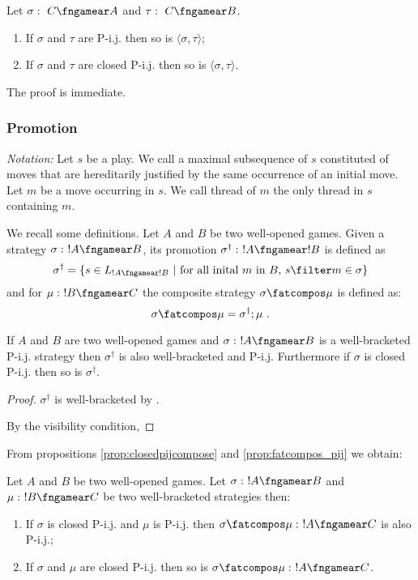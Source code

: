 \begin{proposition}
\label{prop:pij_paring} Let $\sigma :\ C \fngamear A$  and $\tau :\
C\fngamear B$.
\begin{enumerate}
\item If $\sigma$ and $\tau$ are P-i.j.
then so is $\langle \sigma , \tau \rangle$;
\item If $\sigma$ and $\tau$ are closed P-i.j. then so is $\langle \sigma , \tau \rangle$.
\end{enumerate}
\end{proposition}
The proof is immediate.


\subsubsection{Promotion}
\emph{Notation:} Let $s$ be a play. We call  a
maximal subsequence of $s$ constituted of moves that are
hereditarily justified by the same occurrence of an initial move.
Let $m$ be a move occurring in $s$. We call thread of $m$ the only
thread in $s$ containing $m$.


We recall some definitions. Let $A$ and $B$ be two well-opened
games. Given a strategy  $\sigma :\ !A \fngamear B$, its promotion
$\sigma^\dag :\ !A\fngamear !B$ is defined as
$$ \sigma^\dag = \{ s \in L_{!A\fngamear !B}\ |\ \mbox{for all inital $m$ in $B$, } s\filter m \in \sigma \}$$
and for $\mu :\ !B\fngamear C$ the composite strategy $\sigma
\fatcompos \mu$ is defined as:
$$ \sigma \fatcompos \mu = \sigma^\dag ; \mu \ .$$

\begin{proposition}
\label{prop:fatcompos_pij} If $A$ and $B$ are two well-opened games
and $\sigma :\ !A \fngamear B$ is a well-bracketed P-i.j. strategy
then $\sigma^\dag$ is also well-bracketed and P-i.j. Furthermore if
$\sigma$ is closed P-i.j. then so is $\sigma^\dagger$.
\end{proposition}
\begin{proof}
$\sigma^\dag$ is well-bracketed by \cite[Proposition
2.10.]{abramsky94full}.

By the visibility condition,
\end{proof}

From propositions \ref{prop:closedpijcompose} and
\ref{prop:fatcompos_pij} we obtain:
\begin{corollary}
Let $A$ and $B$ be two well-opened games. Let $\sigma :\ !A
\fngamear B$ and $\mu :\ !B\fngamear C$ be two well-bracketed
strategies then:
\begin{enumerate}
\item If $\sigma$ is closed P-i.j.
and $\mu$ is P-i.j. then $\sigma \fatcompos \mu :\ !A \fngamear
C$ is also P-i.j.;
\item If $\sigma$ and $\mu$ are closed P-i.j. then so is $\sigma \fatcompos \mu :\ !A \fngamear C$.
\end{enumerate}
\end{corollary}

